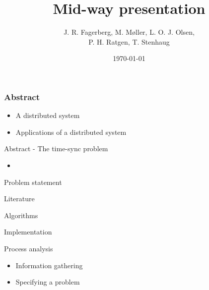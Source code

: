 \documentclass{beamer}
\title{Mid-way presentation}
\author{J. R. Fagerberg, M. Møller, L. O. J. Olsen,\\ P. H. Ratgen, T. Stenhaug}
\institute{IMADA}
\date{\today}
\begin{document}
 
\frame{\titlepage}
 
\begin{frame}
\frametitle{Abstract}
\begin{itemize}
    \item A distributed system
    \item Applications of a distributed system
\end{itemize}
\end{frame}

\begin{frame}{Abstract - The time-sync problem}
    \begin{itemize}
        \item 
    \end{itemize}
\end{frame}

\begin{frame}{Problem statement}
    
\end{frame}
 
\begin{frame}{Literature}
     
\end{frame}
 
\begin{frame}{Algorithms}
    
\end{frame}

\begin{frame}{Implementation}
    
\end{frame}
 
\begin{frame}{Process analysis}
    \begin{itemize}
        \item Information gathering
        \item Specifying a problem
    \end{itemize}
\end{frame}
 
\end{document}
